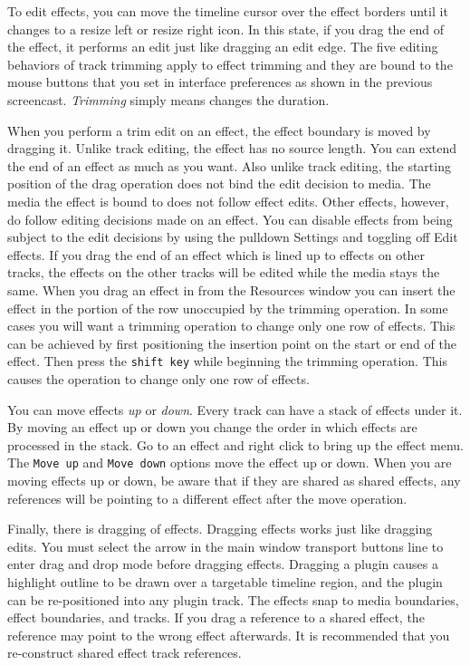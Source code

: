 To edit effects, you can move the timeline cursor over the effect borders until it changes to a resize left or resize right icon. In this state, if you drag the end of the effect, it performs an edit just like dragging an edit edge. The five editing behaviors of track trimming apply to effect trimming and they are bound to the mouse buttons that you set in interface preferences as shown in the previous screencast. \textit{Trimming} simply means changes the duration.

When you perform a trim edit on an effect, the effect boundary is moved by dragging it. Unlike track editing, the effect has no source length. You can extend the end of an effect as much as you want. Also unlike track editing, the starting position of the drag operation does not bind the edit decision to media. The media the effect is bound to does not follow effect edits. Other effects, however, do follow editing decisions made on an effect. You can disable effects from being subject to the edit decisions by using the pulldown Settings and toggling off Edit effects. If you drag the end of an effect which is lined up to effects on other tracks, the effects on the other tracks will be edited while the media stays the same. When you drag an effect in from the Resources window you can insert the effect in the portion of the row unoccupied by the trimming operation. In some cases you will want a trimming operation to change only one row of effects. This can be achieved by first positioning the insertion point on the start or end of the effect. Then press the \texttt{shift key} while beginning the trimming operation. This causes the operation to change only one row of effects.

You can move effects \textit{up} or \textit{down}. Every track can have a stack of effects under it. By moving an effect up or down you change the order in which effects are processed in the stack. Go to an effect and right click to bring up the effect menu. The \texttt{Move up} and \texttt{Move down} options move the effect up or down. When you are moving effects up or down, be aware that if they are shared as shared effects, any references will be pointing to a different effect after the move operation.

Finally, there is dragging of effects. Dragging effects works just like dragging edits. You must select the arrow in the main window transport buttons line to enter drag and drop mode before dragging effects. Dragging a plugin causes a highlight outline to be drawn over a targetable timeline region, and the plugin can be re-positioned into any plugin track.  The effects snap to media boundaries, effect boundaries, and tracks. If you drag a reference to a shared effect, the reference may point to the wrong effect afterwards.  It is recommended that you re-construct shared effect track references.

